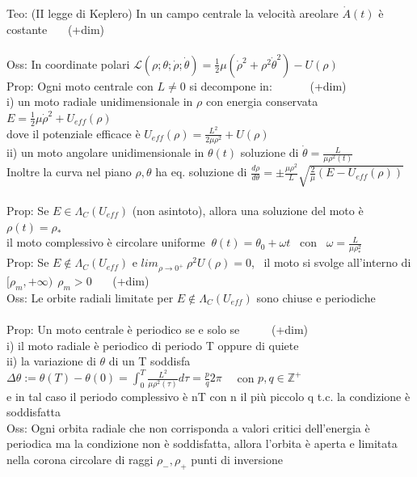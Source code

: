 \documentclass{article}
\theoremstyle{unnumbered}
\theoremstyle{unnumbered1}
\begin{document}
Teo: (II legge di Keplero) In un campo centrale la velocità areolare $\Dot{A}(t)$ è costante \ \ \ (+dim)\\ \\
%
%
%
Oss: In coordinate polari $\mathcal{L}(\rho;\theta;\dot{\rho};\dot{\theta}) = \frac{1}{2}\mu (\dot{\rho}^2+\rho^2 \dot{\theta}^2) -U(\rho)$\\
%
Prop: Ogni moto centrale con $L\neq0$ si decompone in: \ \ \ \ \ \ (+dim)\\
\phantom{Prop: }i) un moto radiale unidimensionale in $\rho$ con energia conservata $E=\frac{1}{2}\mu\Dot{\rho}^2 +U_{eff}(\rho) $ \\
\phantom{Prop: i) }dove il potenziale efficace è $U_{eff}(\rho)=\frac{L^2}{2\mu\rho^2}+U(\rho) $\\
\phantom{Prop: }ii) un moto angolare unidimensionale in $\theta(t)$ soluzione di $\Dot{\theta}=\frac{L}{\mu\rho^2(t)} $ \\
\phantom{Prop: ii) }Inoltre la curva nel piano $\rho,\theta$ ha eq.\! soluzione di $\frac{d\rho}{d\theta}=\pm \frac{\mu\rho^2}{L}\sqrt{\frac{2}{\mu}(E-U_{eff}(\rho))}$ \\ \\
%
%
%
Prop: Se $E\in\Lambda_C(U_{eff})$ (non asintoto), allora una soluzione del moto è $\rho(t)=\rho_* $\\
\phantom{Prop: }il moto complessivo è circolare uniforme $ \ \theta(t)=\theta_0+\omega t$ \ con \ $\omega=\frac{L}{\mu\rho_*^2}$ \\
%
Prop: Se $E\notin\Lambda_C(U_{eff})$ e $lim_{\rho\rightarrow0^+}\ \rho^2U(\rho)=0$, \ il moto si svolge all'interno di $[\rho_m,+\infty)\ \ \rho_m>0$ \ \ \ (+dim)\\
%
Oss: Le orbite radiali limitate per $E\notin\Lambda_C(U_{eff})$ sono chiuse e periodiche \\ \\
%
%
%
Prop: Un moto centrale è periodico se e solo se \ \ \ \ \ (+dim)\\
\phantom{Prop: }i) il moto radiale è periodico di periodo T oppure di quiete \\
\phantom{Prop: }ii) la variazione di $\theta$ di un T soddisfa \ \ $\Delta\theta := \theta(T)-\theta(0) = \int_0^T\frac{L^2}{\mu\rho^2(\tau)}d\tau=\frac{p}{q}2\pi$ \ \ con $p,q\in\mathbb{Z}^+$ \\
\phantom{Prop: ii) }e in tal caso il periodo complessivo è nT con n il più piccolo q t.c.\! la condizione è soddisfatta \\
%
Oss: Ogni orbita radiale che non corrisponda a valori critici dell'energia è periodica ma la condizione non è soddisfatta, allora l'orbita è aperta e limitata nella corona circolare di raggi $\rho_-, \rho_+$ punti di inversione
\end{document}
